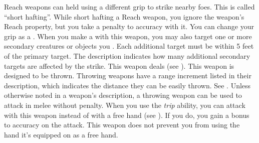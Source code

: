         Reach weapons can held using a different grip to strike nearby foes.
        This is called ``short hafting''.
        While short hafting a Reach weapon, you ignore the weapon's Reach property, but you take a  penalty to accuracy with it.
        You can change your grip as a .
         When you make a  with this weapon, you may also target one or more secondary creatures or objects you .
        Each additional target must be within 5 feet of the primary target.
        The description indicates how many additional secondary targets are affected by the strike.
         This weapon deals  (see ).
         This weapon is designed to be thrown. Throwing weapons have a range increment listed in their description, which indicates the distance they can be easily thrown. See .
        Unless otherwise noted in a weapon's description, a throwing weapon can be used to attack in melee without penalty.
         When you use the \textit{trip} ability, you can attack with this weapon instead of with a free hand (see ).
        If you do, you gain a  bonus to accuracy on the attack.
         This weapon does not prevent you from using the hand it's equipped on as a free hand.

